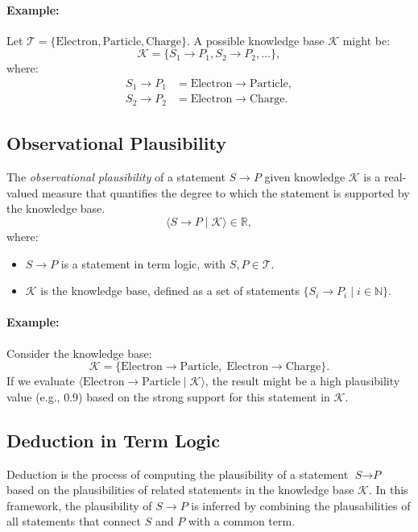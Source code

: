 \documentclass{article}
\newcommand{\term}[1]{\textit{#1}}
\newcommand{\tstatement}[2]{\term{#1} \to \term{#2}}
\begin{document}
\paragraph{Example:}
Let $\mathcal{T} = \{\text{Electron}, \text{Particle}, \text{Charge}\}$. A possible knowledge base $\mathcal{K}$ might be:
$$
\mathcal{K} = \{S_1 \to P_1, S_2 \to P_2, \dots\},
$$
where:
\begin{align*}
S_1 \to P_1 & = \text{Electron} \to \text{Particle}, \\
S_2 \to P_2 & = \text{Electron} \to \text{Charge}.
\end{align*}

\subsection{Observational Plausibility}

The \emph{observational plausibility} of a statement $S \to P$ given knowledge $\mathcal{K}$ is a real-valued measure that quantifies the degree to which the statement is supported by the knowledge base.
$$
\langle S \to P \mid \mathcal{K} \rangle \in \mathbb{R},
$$
where:
\begin{itemize}
    \item $S \to P$ is a statement in term logic, with $S, P \in \mathcal{T}$.
    \item $\mathcal{K}$ is the knowledge base, defined as a set of statements $\{S_i \to P_i \mid i \in \mathbb{N}\}$.
\end{itemize}

\paragraph{Example:}
Consider the knowledge base:
$$
\mathcal{K} = \{\text{Electron} \to \text{Particle}, \; \text{Electron} \to \text{Charge}\}.
$$
If we evaluate $\langle \text{Electron} \to \text{Particle} \mid \mathcal{K} \rangle$, the result might be a high plausibility value (e.g., $0.9$) based on the strong support for this statement in $\mathcal{K}$.

\subsection{Deduction in Term Logic}

Deduction is the process of computing the plausibility of a statement $\tstatement{S}{P}$ based on the plausibilities of related statements in the knowledge base $\mathcal{K}$. In this framework, the plausibility of $S \to P$ is inferred by combining the plausabilities of all statements that connect $S$ and $P$ with a common term.
\end{document}
